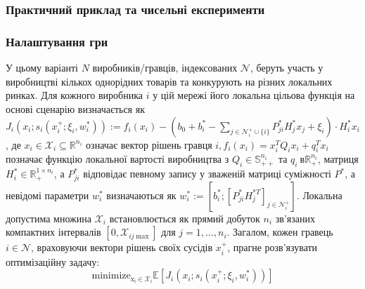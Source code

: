 \documentclass[a4paper]{article}
\begin{document}
\hline\\\

\clearpage
\subsubsection{Практичний приклад та чисельні експерименти}

\subsubsection*{Налаштування гри}
У цьому варіанті $N$ виробників/гравців, індексованих $\mathcal{N}$, беруть участь у виробництві кількох однорідних товарів та конкурують на різних локальних ринках. Для кожного виробника $i$ у цій мережі його локальна цільова функція на основі сценарію визначається як $J_{i}(x_{i} ; s_{i}(x_{i}^{+} ; \xi_{i}, w_{i}^{*})):=f_{i}(x_{i})-(b_{0}+b_{i}^{ *}-\sum_{j \in \mathcal{N}_{i}^{+} \cup\{i\}} P_{j i}^{*} H_{j}^{*} x_{j} + \xi_{i}) \cdot H_{i}^{*} x_{i}$, де $x_{i} \in \mathcal{X}_{i} \subseteq \mathbb{R}^ {n_{i}}$ означає вектор рішень гравця $i, f_{i}(x_{i})=x_{i}^{T} Q_{i} x_{i}+q_{ i}^{T} x_{i}$ позначає функцію локальної вартості виробництва з $Q_{i} \in \mathbb{S}_{++}^{n_{i}}$ та $q_{i} \ в \mathbb{R}_{+}^{n_{i}}$, матриця $H_{i}^{*} \in \mathbb{R}_{+}^{1 \times n_{i} }$, а $P_{j i}^{*}$ відповідає певному запису у зваженій матриці суміжності $P^{*}$, а невідомі параметри $w_{i}^{*}$ визначаються як $ w_{i}^{*}:=[b_{i}^{*} ;[P_{j i}^{*} H_{j}^{* T}]_{j \in \mathcal{N}_{i}^{+}}]$. Локальна допустима множина $\mathcal{X}_{i}$ встановлюється як прямий добуток $n_{i}$ зв'язаних компактних інтервалів $[0, \mathcal{X}_{i j \max }]$ для $j=1, \ldots, n_{i}$. Загалом, кожен гравець $i \in \mathcal{N}$, враховуючи вектори рішень своїх сусідів $x_{i}^{+}$, прагне розв'язувати оптимізаційну задачу:
\begin{equation}
    \operatorname{minimize_{x_{i} \in \mathcal{X}_{i}}} \mathbb{E}[J_{i}(x_{i} ; s_{i}( x_{i}^{+} ; \xi_{i}, w_{i}^{*}))]
\end{equation}
\end{document}
